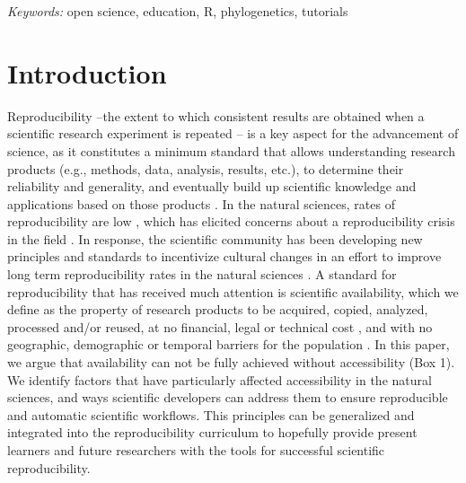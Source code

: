 \documentclass[12pt]{article}
\begin{document}
\noindent%
{\it Keywords:}  open science, education, R, phylogenetics, tutorials
\vfill

\newpage
{} %
\section*{Introduction}
\label{sec:intro}

Reproducibility --the extent to which consistent results are obtained when a scientific
research experiment is repeated \citep{repdef2021}-- is a key aspect for the advancement
of science, as it constitutes a minimum standard that allows understanding research products
(e.g., methods, data, analysis, results, etc.),
to determine their reliability and generality, and eventually build up scientific
knowledge and applications based on those products
\citep{king1995replication, peng2011reproducible, powers2019open}.
In the natural sciences, rates of reproducibility are low \citep{ioannidis2005most, prinz2011believe},
which has elicited concerns about a reproducibility crisis in the field \citep{baker2016reproducibility}.
In response, the scientific community has been developing new principles and standards to incentivize
cultural changes in an effort to improve long term reproducibility rates in the natural sciences
\citep{peng2015reproducibility, wilkinson2016fair}.
A standard for reproducibility that has received much attention is scientific availability, which
we define as the property of research products to be acquired, copied, analyzed,
processed and/or reused, at no financial, legal or technical cost \citep{arnold2019turing},
and with no geographic, demographic or temporal barriers for the population \citep{fecher2014open}.
In this paper, we argue that availability can not be fully achieved without accessibility (Box 1).
We identify factors that have particularly affected accessibility in
the natural sciences, and ways scientific developers can address them to ensure reproducible
and automatic scientific workflows. This principles can be generalized and integrated
into the reproducibility curriculum to hopefully provide present learners and future researchers with
the tools for successful scientific reproducibility.
\end{document}
